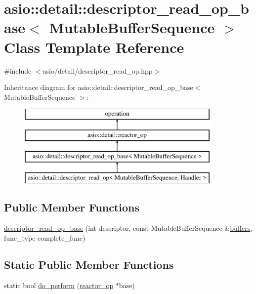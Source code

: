 \hypertarget{classasio_1_1detail_1_1descriptor__read__op__base}{}\section{asio\+:\+:detail\+:\+:descriptor\+\_\+read\+\_\+op\+\_\+base$<$ Mutable\+Buffer\+Sequence $>$ Class Template Reference}
\label{classasio_1_1detail_1_1descriptor__read__op__base}


{\ttfamily \#include $<$asio/detail/descriptor\+\_\+read\+\_\+op.\+hpp$>$}

Inheritance diagram for asio\+:\+:detail\+:\+:descriptor\+\_\+read\+\_\+op\+\_\+base$<$ Mutable\+Buffer\+Sequence $>$\+:\begin{figure}[H]
\begin{center}
\leavevmode
\includegraphics[height=4.000000cm]{classasio_1_1detail_1_1descriptor__read__op__base}
\end{center}
\end{figure}
\subsection*{Public Member Functions}
\begin{DoxyCompactItemize}
\item 
\hyperlink{classasio_1_1detail_1_1descriptor__read__op__base_a86176fbadcdbedfa8ca1eeb7e76c3746}{descriptor\+\_\+read\+\_\+op\+\_\+base} (int descriptor, const Mutable\+Buffer\+Sequence \&\hyperlink{group__async__read_ga54dede45c3175148a77fe6635222c47d}{buffers}, func\+\_\+type complete\+\_\+func)
\end{DoxyCompactItemize}
\subsection*{Static Public Member Functions}
\begin{DoxyCompactItemize}
\item 
static bool \hyperlink{classasio_1_1detail_1_1descriptor__read__op__base_a25af56c711244e28b14cacec36262586}{do\+\_\+perform} (\hyperlink{classasio_1_1detail_1_1reactor__op}{reactor\+\_\+op} $\ast$base)
\end{DoxyCompactItemize}
